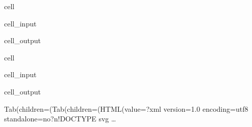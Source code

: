 \documentclass[letterpaper,10pt,english]{jupyterBook}
\begin{document}
\begin{sphinxuseclass}{cell}\begin{sphinxVerbatimInput}

\begin{sphinxuseclass}{cell_input}
\begin{sphinxVerbatim}[commandchars=\\\{\}]
\end{sphinxVerbatim}

\end{sphinxuseclass}\end{sphinxVerbatimInput}
\begin{sphinxVerbatimOutput}

\begin{sphinxuseclass}{cell_output}
\begin{sphinxVerbatim}
\end{sphinxVerbatim}

\end{sphinxuseclass}\end{sphinxVerbatimOutput}

\end{sphinxuseclass}
\begin{sphinxuseclass}{cell}\begin{sphinxVerbatimInput}

\begin{sphinxuseclass}{cell_input}
\begin{sphinxVerbatim}[commandchars=\\\{\}]
\PYG{p}{[}\PYG{p}{]}
\end{sphinxVerbatim}

\end{sphinxuseclass}\end{sphinxVerbatimInput}
\begin{sphinxVerbatimOutput}

\begin{sphinxuseclass}{cell_output}
\begin{sphinxVerbatim}[commandchars=\\\{\}]
Tab(children=(Tab(children=(HTML(value=\PYGZsq{}\PYGZlt{}?xml version=\PYGZdq{}1.0\PYGZdq{} encoding=\PYGZdq{}utf\PYGZhy{}8\PYGZdq{} standalone=\PYGZdq{}no\PYGZdq{}?\PYGZgt{}\PYGZbs{}n\PYGZlt{}!DOCTYPE svg …
\end{sphinxVerbatim}

\begin{sphinxVerbatim}[commandchars=\\\{\}]

\end{sphinxVerbatim}

\end{sphinxuseclass}\end{sphinxVerbatimOutput}

\end{sphinxuseclass}
\end{document}
